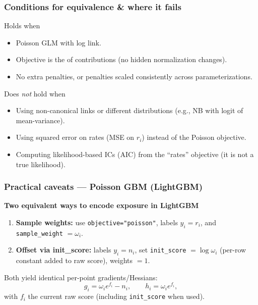 \documentclass[10pt,aspectratio=169,xcolor={dvipsnames},usepdftitle=false]{beamer}
\begin{document}
\begin{frame}
\frametitle{Conditions for equivalence \& where it fails}
\small
\begin{block}{Holds when}
\begin{itemize}
\item Poisson GLM with  log link.
\item Objective is the  of contributions (no hidden normalization changes).
\item No extra penalties, or penalties scaled consistently across parameterizations.
\end{itemize}
\end{block}
\begin{alertblock}{Does \emph{not} hold when}
\begin{itemize}
\item Using non-canonical links or different distributions (e.g., NB with logit of mean-variance).
\item Using squared error on rates (MSE on $r_i$) instead of the Poisson objective.
\item Computing likelihood-based ICs (AIC) from the ``rates'' objective (it is not a true likelihood).
\end{itemize}
\end{alertblock}
\end{frame}

\begin{frame}
\frametitle{Practical caveats — Poisson GBM (LightGBM)}
\small
\textbf{Two equivalent ways to encode exposure in LightGBM}
\begin{enumerate}
\item \textbf{Sample weights:} use \texttt{objective="poisson"}, labels $y_i=r_i$, and \texttt{sample\_weight} $=\omega_i$.
\item \textbf{Offset via init\_score:} labels $y_i=n_i$, set \texttt{init\_score} $=\log \omega_i$ (per-row constant added to raw score), weights $=1$.
\end{enumerate}
Both yield identical per-point gradients/Hessians:
\[
g_i=\omega_i e^{f_i}-n_i,\qquad h_i=\omega_i e^{f_i},
\]
with $f_i$ the current raw score (including \texttt{init\_score} when used).


\end{frame}
\end{document}
